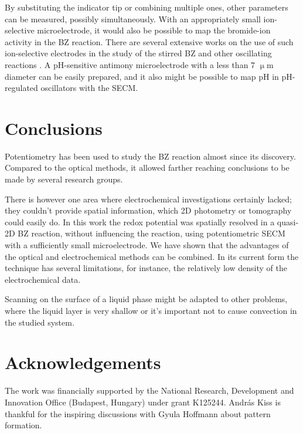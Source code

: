 \documentclass[3p]{elsarticle}
\begin{document}
By substituting the indicator tip or combining multiple ones, other parameters can be measured, possibly simultaneously.
With an appropriately small ion-selective microelectrode, it would also be possible to map the bromide-ion activity in the BZ reaction.
There are several extensive works on the use of such ion-selective electrodes in the study of the stirred BZ and other oscillating reactions \cite{noszticzius1982use, noszticzius1983use}.
A pH-sensitive antimony microelectrode with a less than 7 $\upmu$m diameter can be easily prepared, and it also might be possible to map pH in pH-regulated oscillators \cite{orban2015ph} with the SECM.


\section{Conclusions}
Potentiometry has been used to study the BZ reaction almost since its discovery.
Compared to the optical methods, it allowed farther reaching conclusions to be made by several research groups.

There is however one area where electrochemical investigations certainly lacked; they couldn't provide spatial information, which 2D photometry or tomography could easily do.
In this work the redox potential was spatially resolved in a quasi-2D BZ reaction, without influencing the reaction, using potentiometric SECM with a sufficiently small microelectrode.
We have shown that the advantages of the optical and electrochemical methods can be combined.
In its current form the technique has several limitations, for instance, the relatively low density of the electrochemical data.

Scanning on the surface of a liquid phase might be adapted to other problems, where the liquid layer is very shallow or it's important not to cause convection in the studied system.

\section*{Acknowledgements}
The work was financially supported by the National Research, Development and Innovation Office (Budapest, Hungary) under grant K125244.
András Kiss is thankful for the inspiring discussions with Gyula Hoffmann about pattern formation.

{}

\end{document}
